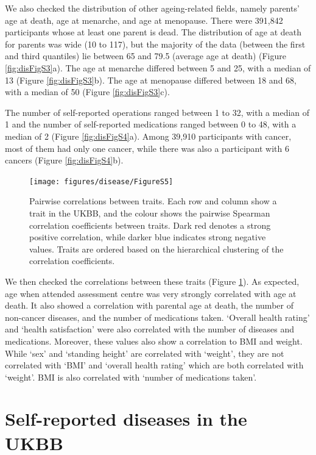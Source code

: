 \documentclass[12pt,twoside]{unicam}
\begin{document}
We also checked the distribution of other ageing-related fields, namely parents' age at death, age at menarche, and age at menopause. There were 391,842 participants whose at least one parent is dead. The distribution of age at death for parents was wide (10 to 117), but the majority of the data (between the first and third quantiles) lie between 65 and 79.5 (average age at death) (Figure \ref{fig:disFigS3}a). The age at menarche differed between 5 and 25, with a median of 13 (Figure \ref{fig:disFigS3}b). The age at menopause differed between 18 and 68, with a median of 50 (Figure \ref{fig:disFigS3}c).

The number of self-reported operations ranged between 1 to 32, with a median of 1 and the number of self-reported medications ranged between 0 to 48, with a median of 2 (Figure \ref{fig:disFigS4}a). Among 39,910 participants with cancer, most of them had only one cancer, while there was also a participant with 6 cancers (Figure \ref{fig:disFigS4}b).

\begin{figure}

{\centering \texttt{[image: figures/disease/FigureS5]} 

}

\caption[Pairwise correlations between traits.]{Pairwise correlations between traits. Each row and column show a trait in the UKBB, and the colour shows the pairwise Spearman correlation coefficients between traits. Dark red denotes a strong positive correlation, while darker blue indicates strong negative values. Traits are ordered based on the hierarchical clustering of the correlation coefficients.}\label{fig:disFigS5}
\end{figure}

We then checked the correlations between these traits (Figure \ref{fig:disFigS5}). As expected, age when attended assessment centre was very strongly correlated with age at death. It also showed a correlation with parental age at death, the number of non-cancer diseases, and the number of medications taken. `Overall health rating' and `health satisfaction' were also correlated with the number of diseases and medications. Moreover, these values also show a correlation to BMI and weight. While `sex' and `standing height' are correlated with `weight', they are not correlated with `BMI' and `overall health rating' which are both correlated with `weight'. BMI is also correlated with `number of medications taken'.

\hypertarget{self-reported-diseases-in-the-ukbb}{%
\section{Self-reported diseases in the UKBB}\label{self-reported-diseases-in-the-ukbb}}
\end{document}

